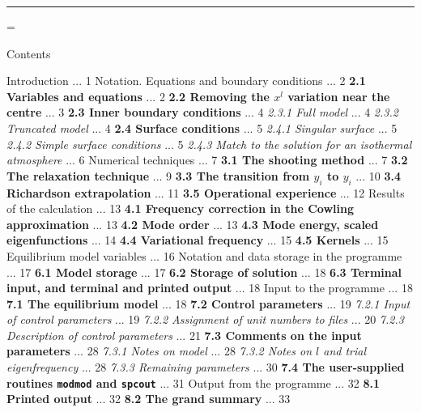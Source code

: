 \medskip
\hrule
\newpage
\null
\footline={\hss\tenrm\folio\hss}
\newpage
\centerline{\twelvebf Contents}
\bigskip
\chaptercont
{ Introduction} ... 1
\chaptercont
{ Notation. Equations and boundary conditions} ... 2
\mainsectcont
{\bf 2.1 Variables and equations} ... 2
\mainsectcont
{\bf 2.2 Removing the $x^l$ variation near the centre} ... 3
\mainsectcont
{\bf 2.3 Inner boundary conditions} ... 4
\subsectcont
{\it 2.3.1 Full model} ... 4
\subsectcont
{\it 2.3.2 Truncated model} ... 4
\mainsectcont
{\bf 2.4 Surface conditions} ... 5
\subsectcont
{\it 2.4.1 Singular surface} ... 5
\subsectcont
{\it 2.4.2 Simple surface conditions} ... 5
\subsectcont
{\it 2.4.3 Match to the solution for an isothermal atmosphere} ... 6
\chaptercont
{ Numerical techniques}  ... 7
\mainsectcont
{\bf 3.1 The shooting method}  ... 7
\mainsectcont
{\bf 3.2 The relaxation technique} ... 9
\mainsectcont
{\bf 3.3 The transition from $\hat y_i$ to $y_i$}  ... 10
\mainsectcont
{\bf 3.4 Richardson extrapolation}  ... 11
\mainsectcont
{\bf 3.5 Operational experience} ... 12
\chaptercont
{ Results of the calculation}  ... 13
\mainsectcont
{\bf 4.1 Frequency correction in the Cowling approximation} ... 13
\mainsectcont
{\bf 4.2 Mode order} ... 13
\mainsectcont
{\bf 4.3 Mode energy, scaled eigenfunctions} ... 14
\mainsectcont
{\bf 4.4 Variational frequency} ... 15
\mainsectcont
{\bf 4.5 Kernels} ... 15
\chaptercont
{ Equilibrium model variables} ... 16
\chaptercont
{ Notation and data storage in the programme} ... 17
\mainsectcont
{\bf 6.1 Model storage} ... 17
\mainsectcont
{\bf 6.2 Storage of solution} ... 18
\mainsectcont
{\bf 6.3 Terminal input, and terminal and printed output}  ... 18
\chaptercont
{ Input to the programme}  ... 18
\mainsectcont
{\bf 7.1 The equilibrium model}  ... 18
\mainsectcont
{\bf 7.2 Control parameters}  ... 19
\subsectcont
{\it 7.2.1 Input of control parameters}  ... 19
\subsectcont
{\it 7.2.2 Assignment of unit numbers to files} ... 20
\subsectcont
{\it 7.2.3 Description of control parameters} ... 21
\mainsectcont
{\bf 7.3 Comments on the input parameters} ... 28
\subsectcont
{\it 7.3.1 Notes on model} ... 28
\subsectcont
{\it 7.3.2 Notes on $l$ and trial eigenfrequency} ... 28
\subsectcont
{\it 7.3.3 Remaining parameters}  ... 30
\mainsectcont
{\bf 7.4 The user-supplied routines {\tt modmod} and {\tt spcout}} ... 31
\chaptercont
{ Output from the programme}  ... 32
\mainsectcont
{\bf 8.1 Printed output} ... 32
\mainsectcont
{\bf 8.2 The grand summary} ... 33
\mainsectcont
